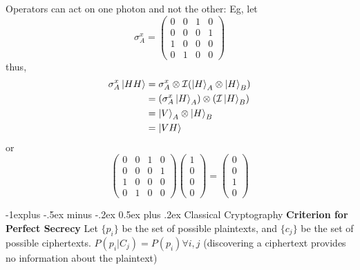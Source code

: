 \documentclass[letterpaper, 8pt]{extarticle}
\makeatletter
\renewcommand{\section}{\@startsection{section}{1}{0mm}%
                                {-1explus -.5ex minus -.2ex}%
                                {0.5ex plus .2ex}%
                                {\normalfont\normalsize\bfseries}}
\makeatother
\begin{document}
\begin{multicols*}{5}
    Operators can act on one photon and not the other:
    Eg, let
    \[
        \sigma_A^x
        = \begin{pmatrix}
            0 & 0 & 1 & 0 \\
            0 & 0 & 0 & 1 \\
            1 & 0 & 0 & 0 \\
            0 & 1 & 0 & 0
        \end{pmatrix}
    \]
    thus,
    \begin{align*}
        \sigma_A^x \ket{HH}
         & = \sigma_A^x \otimes \mathcal{I} (\ket{H}_A \otimes \ket{H}_B) \\
         & = (\sigma_A^x \ket{H}_A) \otimes (\mathcal{I} \ket{H}_B)       \\
         & = \ket{V}_A \otimes \ket{H}_B                                  \\
         & = \ket{VH}
    \end{align*}
    or
    \[
        \begin{pmatrix}
            0 & 0 & 1 & 0 \\
            0 & 0 & 0 & 1 \\
            1 & 0 & 0 & 0 \\
            0 & 1 & 0 & 0
        \end{pmatrix}
        \begin{pmatrix}
            1 \\
            0 \\
            0 \\
            0
        \end{pmatrix}
        =
        \begin{pmatrix}
            0 \\
            0 \\
            1 \\
            0
        \end{pmatrix}
    \]

    \section{Classical Cryptography}
    \textbf{Criterion for Perfect Secrecy}
    Let \(\{p_i\}\) be the set of possible plaintexts,
    and \(\{c_j\}\) be the set of possible ciphertexts.
    \(
    P(p_i | C_j) = P(p_i) \forall i, j
    \)
    (discovering a ciphertext provides no information about the plaintext)



\end{multicols*}
\end{document}
